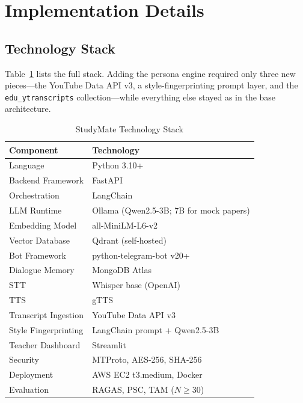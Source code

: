 \documentclass[conference]{IEEEtran}
\begin{document}
\section{Implementation Details}
\subsection{Technology Stack}
Table~\ref{tab:stack} lists the full stack. Adding the persona engine
required only three new pieces---the YouTube Data API v3, a
style-fingerprinting prompt layer, and the \texttt{edu\_ytranscripts}
collection---while everything else stayed as in the base architecture.
\begin{table}[htbp]
\caption{StudyMate Technology Stack}
\label{tab:stack}
\begin{tabular}{ll}
\toprule
\textbf{Component}             & \textbf{Technology} \\
\midrule
Language                       & Python 3.10+ \\
Backend Framework              & FastAPI \\
Orchestration                  & LangChain \\
LLM Runtime                    & Ollama (Qwen2.5-3B; 7B for mock papers) \\
Embedding Model                & all-MiniLM-L6-v2 \\
Vector Database                & Qdrant (self-hosted) \\
Bot Framework                  & python-telegram-bot v20+ \\
Dialogue Memory                & MongoDB Atlas \\
STT                            & Whisper base (OpenAI) \\
TTS                            & gTTS \\
Transcript Ingestion           & YouTube Data API v3 \\
Style Fingerprinting           & LangChain prompt + Qwen2.5-3B \\
Teacher Dashboard              & Streamlit \\
Security                       & MTProto, AES-256, SHA-256 \\
Deployment                     & AWS EC2 t3.medium, Docker \\
Evaluation                     & RAGAS, PSC, TAM ($N{\geq}30$) \\
\bottomrule
\end{tabular}
\end{table}
\end{document}
